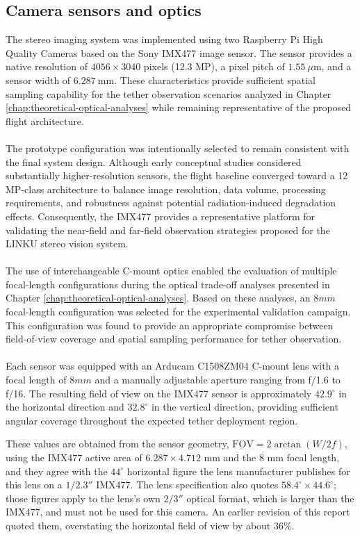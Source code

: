 \subsection{Camera sensors and optics}
\label{sec:camera_sensors}
The stereo imaging system was implemented using two Raspberry Pi High Quality Cameras based on the Sony IMX477 image sensor. The sensor provides a native resolution of $4056 \times 3040$ pixels (12.3 MP), a pixel pitch of $1.55~\mu\mathrm{m}$, and a sensor width of $6.287~\mathrm{mm}$. These characteristics provide sufficient spatial sampling capability for the tether observation scenarios analyzed in Chapter \ref{chap:theoretical-optical-analyses} while remaining representative of the proposed flight architecture.
\\\\
The prototype configuration was intentionally selected to remain consistent with the final system design. Although early conceptual studies considered substantially higher-resolution sensors, the flight baseline converged toward a 12 MP-class architecture to balance image resolution, data volume, processing requirements, and robustness against potential radiation-induced degradation effects. Consequently, the IMX477 provides a representative platform for validating the near-field and far-field observation strategies proposed for the LINKU stereo vision system.
\\\\
The use of interchangeable C-mount optics enabled the evaluation of multiple focal-length configurations during the optical trade-off analyses presented in Chapter \ref{chap:theoretical-optical-analyses}. Based on these analyses, an $8 mm$ focal-length configuration was selected for the experimental validation campaign. This configuration was found to provide an appropriate compromise between field-of-view coverage and spatial sampling performance for tether observation.
\\\\
Each sensor was equipped with an Arducam C1508ZM04 C-mount lens with a focal length of $8 mm$ and a manually adjustable aperture ranging from f/1.6 to f/16. The resulting field of view on the IMX477 sensor is approximately $42.9^\circ$ in the horizontal direction and $32.8^\circ$ in the vertical direction, providing sufficient angular coverage throughout the expected tether deployment region.

These values are obtained from the sensor geometry, $\mathrm{FOV} = 2\arctan\left(W/2f\right)$, using the IMX477 active area of $6.287 \times 4.712$ mm and the $8$ mm focal length, and they agree with the $44^\circ$ horizontal figure the lens manufacturer publishes for this lens on a $1/2.3''$ IMX477. The lens specification also quotes $58.4^\circ \times 44.6^\circ$; those figures apply to the lens's own $2/3''$ optical format, which is larger than the IMX477, and must not be used for this camera. An earlier revision of this report quoted them, overstating the horizontal field of view by about $36\%$.


